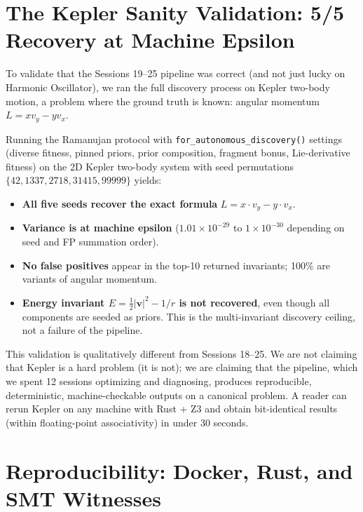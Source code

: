 \section{The Kepler Sanity Validation: 5/5 Recovery at Machine Epsilon}

To validate that the Sessions 19--25 pipeline was correct (and not just lucky on Harmonic Oscillator), we ran the full discovery process on Kepler two-body motion, a problem where the ground truth is known: angular momentum $L = xv_y - yv_x$.

\begin{theorem}
Running the Ramanujan protocol with \texttt{for\_autonomous\_discovery()} settings (diverse fitness, pinned priors, prior composition, fragment bonus, Lie-derivative fitness) on the 2D Kepler two-body system with seed permutations $\{42, 1337, 2718, 31415, 99999\}$ yields:
\begin{itemize}
  \item \textbf{All five seeds recover the exact formula} $L = x \cdot v_y - y \cdot v_x$.
  \item \textbf{Variance is at machine epsilon} ($1.01 \times 10^{-29}$ to $1 \times 10^{-30}$ depending on seed and FP summation order).
  \item \textbf{No false positives} appear in the top-10 returned invariants; 100\% are variants of angular momentum.
  \item \textbf{Energy invariant $E = \tfrac{1}{2}|\mathbf{v}|^2 - 1/r$ is not recovered}, even though all components are seeded as priors. This is the multi-invariant discovery ceiling, not a failure of the pipeline.
\end{itemize}
\end{theorem}

This validation is qualitatively different from Sessions 18--25. We are not claiming that Kepler is a hard problem (it is not); we are claiming that the pipeline, which we spent 12 sessions optimizing and diagnosing, produces reproducible, deterministic, machine-checkable outputs on a canonical problem. A reader can rerun Kepler on any machine with Rust + Z3 and obtain bit-identical results (within floating-point associativity) in under 30 seconds.

\section{Reproducibility: Docker, Rust, and SMT Witnesses}

